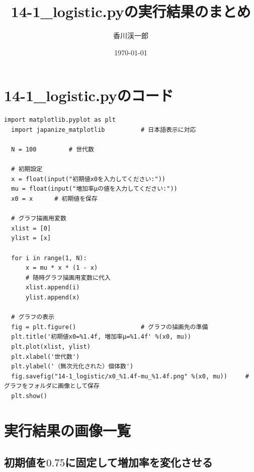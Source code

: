 \documentclass[a4paper, oneside]{jsarticle}
\begin{document}
\title{14-1\_logistic.pyの実行結果のまとめ}
\author{香川渓一郎}
\date{\today}

\maketitle

\setcounter{tocdepth}{1}
\tableofcontents

\section{14-1\_logistic.pyのコード}

\begin{lstlisting}[caption=14-1\_logistic.py, label=logistic]
  import matplotlib.pyplot as plt
  import japanize_matplotlib          # 日本語表示に対応
  
  N = 100         # 世代数
  
  # 初期設定
  x = float(input("初期値x0を入力してください:"))
  mu = float(input("増加率μの値を入力してください:"))
  x0 = x      # 初期値を保存
  
  # グラフ描画用変数
  xlist = [0]
  ylist = [x]
  
  for i in range(1, N):
      x = mu * x * (1 - x)
      # 随時グラフ描画用変数に代入
      xlist.append(i)
      ylist.append(x)
  
  # グラフの表示
  fig = plt.figure()                  # グラフの描画先の準備
  plt.title('初期値x0=%1.4f, 増加率μ=%1.4f' %(x0, mu))
  plt.plot(xlist, ylist)
  plt.xlabel('世代数')
  plt.ylabel('（無次元化された）個体数')
  fig.savefig("14-1_logistic/x0_%1.4f-mu_%1.4f.png" %(x0, mu))     # グラフをフォルダに画像として保存
  plt.show()
\end{lstlisting}

\section{実行結果の画像一覧}
\subsection{初期値を$0.75$に固定して増加率を変化させる}
\end{document}
